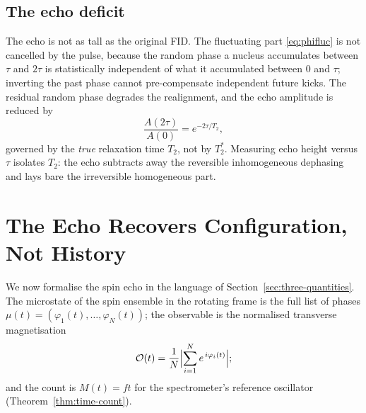 \documentclass[11pt,a4paper]{article}
\theoremstyle{thmstyle}
\theoremstyle{definition}
\theoremstyle{remark}
\newcommand{\Tstar}{T_{2}^{*}}
\newcommand{\Ttwo}{T_{2}}
\newcommand{\Count}{M}
\newcommand{\Obs}{\mathcal{O}}
\newcommand{\Mic}{\mu}
\begin{document}
\subsection{The echo deficit}
\label{sec:deficit}

The echo is not as tall as the original FID. The fluctuating part
\eqref{eq:phifluc} is not cancelled by the pulse, because the random
phase a nucleus accumulates between $\tau$ and $2\tau$ is statistically
independent of what it accumulated between $0$ and $\tau$; inverting the
past phase cannot pre-compensate independent future kicks. The residual
random phase degrades the realignment, and the echo amplitude is reduced
by
\begin{equation}
\frac{A(2\tau)}{A(0)}=e^{-2\tau/\Ttwo},
\label{eq:echodeficit}
\end{equation}
governed by the \emph{true} relaxation time $\Ttwo$, not by $\Tstar$.
Measuring echo height versus $\tau$ isolates $\Ttwo$: the echo subtracts
away the reversible inhomogeneous dephasing and lays bare the
irreversible homogeneous part.

\section{The Echo Recovers Configuration, Not History}
\label{sec:configuration}

We now formalise the spin echo in the language of
Section~\ref{sec:three-quantities}. The microstate of the spin ensemble
in the rotating frame is the full list of phases
$\Mic(t)=(\varphi_{1}(t),\dots,\varphi_{N}(t))$; the observable is the
normalised transverse magnetisation
\begin{equation}
\Obs(t)=\frac{1}{N}\Bigl|\sum_{i=1}^{N}e^{\,i\varphi_{i}(t)}\Bigr|;
\label{eq:obs}
\end{equation}
and the count is $\Count(t)=ft$ for the spectrometer's reference
oscillator (Theorem~\ref{thm:time-count}).
\end{document}
